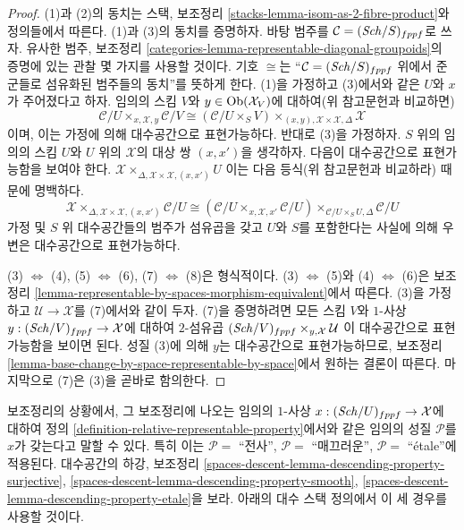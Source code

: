 \begin{proof}
(1)과 (2)의 동치는 스택, 보조정리
\ref{stacks-lemma-isom-as-2-fibre-product}와 정의들에서 따른다.
(1)과 (3)의 동치를 증명하자. 바탕 범주를
$\mathcal{C} = (\mathit{Sch}/S)_{fppf}$로 쓰자. 유사한 범주, 보조정리
\ref{categories-lemma-representable-diagonal-groupoids}의 증명에 있는
관찰 몇 가지를 사용할 것이다. 기호 $\cong$는 ``$\mathcal{C} =
(\mathit{Sch}/S)_{fppf}$ 위에서 준군들로 섬유화된 범주들의 동치''를 뜻하게
한다. (1)을 가정하고 (3)에서와 같은 $U$와 $x$가 주어졌다고 하자.
임의의 스킴 $V$와 $y \in \mathop{\mathrm{Ob}}\nolimits(\mathcal{X}_V)$에 대하여(위 참고문헌과
비교하면)
$$
\mathcal{C}/U
\times_{x, \mathcal{X}, y}
\mathcal{C}/V
\cong
(\mathcal{C}/U \times_S V)
\times_{(x, y), \mathcal{X} \times \mathcal{X}, \Delta}
\mathcal{X}
$$
이며, 이는 가정에 의해 대수공간으로 표현가능하다. 반대로 (3)을
가정하자. $S$ 위의 임의의 스킴 $U$와 $U$ 위의 $\mathcal{X}$의 대상
쌍 $(x, x')$을 생각하자. 다음이 대수공간으로 표현가능함을 보여야 한다.
$\mathcal{X} \times_{\Delta, \mathcal{X} \times \mathcal{X}, (x, x')} U$
이는 다음 등식(위 참고문헌과 비교하라) 때문에 명백하다.
$$
\mathcal{X}
\times_{\Delta, \mathcal{X} \times \mathcal{X}, (x, x')}
\mathcal{C}/U
\cong
(\mathcal{C}/U \times_{x, \mathcal{X}, x'} \mathcal{C}/U)
\times_{\mathcal{C}/U \times_S U, \Delta}
\mathcal{C}/U
$$
가정 및 $S$ 위 대수공간들의 범주가 섬유곱을 갖고 $U$와 $S$를
포함한다는 사실에 의해 우변은 대수공간으로 표현가능하다.

\medskip\noindent
(3) $\Leftrightarrow$ (4), (5) $\Leftrightarrow$ (6), (7)
$\Leftrightarrow$ (8)은 형식적이다. (3) $\Leftrightarrow$ (5)와
(4) $\Leftrightarrow$ (6)은 보조정리
\ref{lemma-representable-by-spaces-morphism-equivalent}에서 따른다.
(3)을 가정하고 $\mathcal{U} \to \mathcal{X}$를 (7)에서와 같이 두자.
(7)을 증명하려면 모든 스킴 $V$와 $1$-사상
$y : (\mathit{Sch}/V)_{fppf} \to \mathcal{X}$에 대하여 $2$-섬유곱
$(\mathit{Sch}/V)_{fppf} \times_{y, \mathcal{X}} \mathcal{U}$
이 대수공간으로 표현가능함을 보이면 된다. 성질 (3)에 의해 $y$는
대수공간으로 표현가능하므로, 보조정리
\ref{lemma-base-change-by-space-representable-by-space}에서 원하는 결론이
따른다. 마지막으로 (7)은 (3)을 곧바로 함의한다.
\end{proof}

\noindent
보조정리의 상황에서, 그 보조정리에 나오는 임의의 $1$-사상
$x : (\mathit{Sch}/U)_{fppf} \to \mathcal{X}$에 대하여 정의
\ref{definition-relative-representable-property}에서와 같은 임의의 성질
$\mathcal{P}$를 $x$가 갖는다고 말할 수 있다. 특히 이는
$\mathcal{P} = $ ``전사'', $\mathcal{P} = $ ``매끄러운'',
$\mathcal{P} = $ ``\'etale''에 적용된다. 대수공간의 하강, 보조정리
\ref{spaces-descent-lemma-descending-property-surjective},
\ref{spaces-descent-lemma-descending-property-smooth},
\ref{spaces-descent-lemma-descending-property-etale}을 보라. 아래의 대수 스택
정의에서 이 세 경우를 사용할 것이다.








